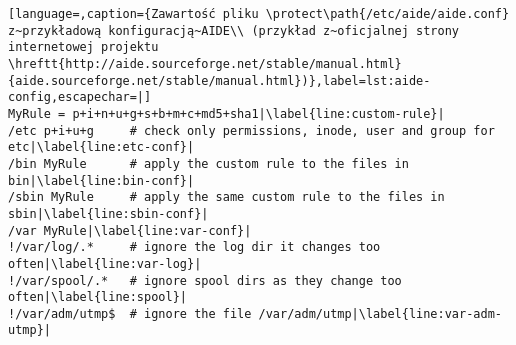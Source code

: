 \documentclass[thesis]{subfiles}
\begin{document}
\begin{lstlisting}[language=,caption={Zawartość pliku \protect\path{/etc/aide/aide.conf} z~przykładową konfiguracją~AIDE\\ (przykład z~oficjalnej strony internetowej projektu \hreftt{http://aide.sourceforge.net/stable/manual.html}{aide.sourceforge.net/stable/manual.html})},label=lst:aide-config,escapechar=|]
MyRule = p+i+n+u+g+s+b+m+c+md5+sha1|\label{line:custom-rule}|
/etc p+i+u+g     # check only permissions, inode, user and group for etc|\label{line:etc-conf}|
/bin MyRule      # apply the custom rule to the files in bin|\label{line:bin-conf}|
/sbin MyRule     # apply the same custom rule to the files in sbin|\label{line:sbin-conf}|
/var MyRule|\label{line:var-conf}|
!/var/log/.*     # ignore the log dir it changes too often|\label{line:var-log}|
!/var/spool/.*   # ignore spool dirs as they change too often|\label{line:spool}|
!/var/adm/utmp$  # ignore the file /var/adm/utmp|\label{line:var-adm-utmp}|
\end{lstlisting}
\end{document}
